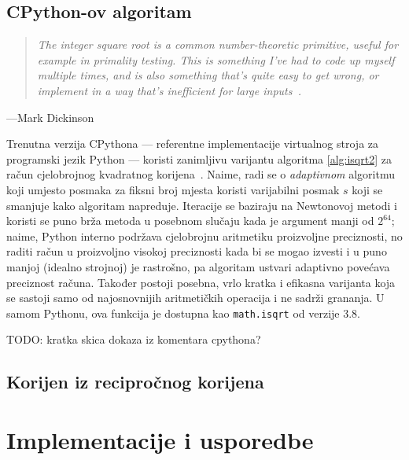 \documentclass[12pt]{scrartcl}
\newcommand{\citat}[2]{\begin{quotation}\textit{#1}\end{quotation}\begin{flushright}---#2\end{flushright}}
\begin{document}
\subsection{CPython-ov algoritam}
\citat{The integer square root is a common number-theoretic primitive, useful for example in primality testing.
This is something I've had to code up myself multiple times, and is also something that's quite easy to get wrong,
or implement in a way that's inefficient for large inputs~\cite{mdickisqrt}.}{Mark Dickinson}

Trenutna verzija CPythona --- referentne implementacije virtualnog stroja za programski jezik Python --- koristi zanimljivu varijantu 
algoritma \ref{alg:isqrt2} za račun cjelobrojnog kvadratnog korijena~\cite{Cpythonisqrt}. Naime, radi se o \emph{adaptivnom} algoritmu
koji umjesto posmaka za fiksni broj mjesta koristi varijabilni posmak $s$ koji se smanjuje kako algoritam napreduje. Iteracije se baziraju
na Newtonovoj metodi i koristi se puno brža metoda u posebnom slučaju kada je argument manji od $2^{64}$; naime, Python interno podržava
cjelobrojnu aritmetiku proizvoljne preciznosti, no raditi račun u proizvoljno visokoj preciznosti kada bi se mogao izvesti i u puno manjoj
(idealno strojnoj) je rastrošno, pa algoritam ustvari adaptivno povećava preciznost računa. Također postoji posebna, vrlo kratka
i efikasna varijanta koja se sastoji samo od najosnovnijih aritmetičkih operacija i ne sadrži grananja.
U samom Pythonu, ova funkcija je dostupna kao \texttt{math.isqrt} od
verzije 3.8.

TODO: kratka skica dokaza iz komentara cpythona?





\subsection{Korijen iz recipročnog korijena}
\section{Implementacije i usporedbe}

\printbibliography
\end{document}
